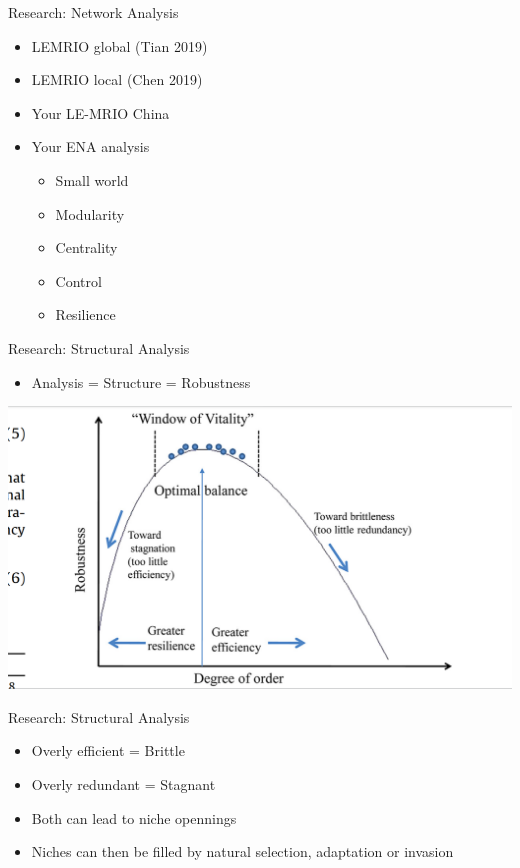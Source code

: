 \documentclass[aspectratio=169]{beamer}
\begin{document}
\begin{frame}{Research: Network Analysis}

\begin{itemize}
\item
  LEMRIO global (Tian 2019)
\item
  LEMRIO local (Chen 2019)
\item
  Your LE-MRIO China
\item
  Your ENA analysis

  \begin{itemize}
  \item
    Small world
  \item
    Modularity
  \item
    Centrality
  \item
    Control
  \item
    Resilience
  \end{itemize}
\end{itemize}

\end{frame}

\begin{frame}{Research: Structural Analysis}

\begin{itemize}
\item
  Analysis = Structure = Robustness
\end{itemize}

\begin{center}\includegraphics[width=0.5\linewidth]{images/Fath_2015_Fig6} \end{center}

\end{frame}

\begin{frame}{Research: Structural Analysis}

\begin{itemize}
\item
  Overly efficient = Brittle
\item
  Overly redundant = Stagnant
\item
  Both can lead to niche opennings
\item
  Niches can then be filled by natural selection, adaptation or invasion
\end{itemize}

\end{frame}
\end{document}
